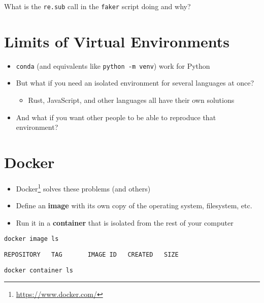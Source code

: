\documentclass[krantzl]{krantz}
\newcommand{\glossref}[1]{\textbf{#1}}
\newcommand{\hreffoot}[2]{{#1}\footnote{\href{#2}{#2}}}
\begin{document}
What is the \texttt{re.sub} call in the \texttt{faker} script doing and why?

\section{Limits of Virtual Environments}
\begin{itemize}
\item \texttt{conda} (and equivalents like \texttt{python -m venv}) work for Python

\item But what if you need an isolated environment for several languages at once?\begin{itemize}
\item Rust, JavaScript, and other languages all have their own solutions

\end{itemize}


\item And what if you want other people to be able to reproduce that environment?

\end{itemize}
\section{Docker}
\begin{itemize}
\item \hreffoot{Docker}{https://www.docker.com/} solves these problems (and others)

\item Define an \glossref{image} with its own copy of the operating system, filesystem, etc.

\item Run it in a \glossref{container} that is isolated from the rest of your computer

\end{itemize}
\begin{lstlisting}[frame=tblr]
docker image ls
\end{lstlisting}

\begin{lstlisting}[frame=tblr,backgroundcolor=\color{black!5}]
REPOSITORY   TAG       IMAGE ID   CREATED   SIZE
\end{lstlisting}

\begin{lstlisting}[frame=tblr]
docker container ls
\end{lstlisting}
\end{document}
